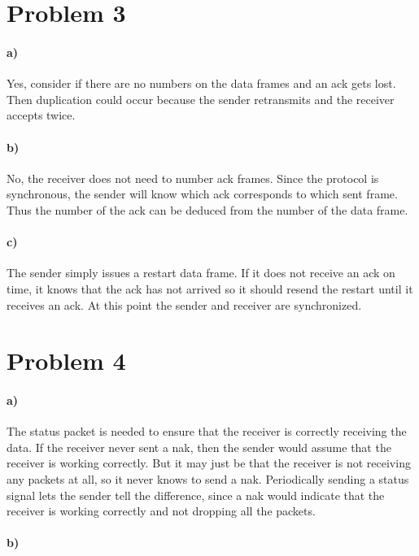 \documentclass[12pt]{article}
\begin{document}
\section*{Problem 3}

\paragraph{a)}

Yes, consider if there are no numbers on the data frames and an ack gets lost. Then duplication could occur because the sender retransmits and the receiver accepts twice.

\paragraph{b)}

No, the receiver does not need to number ack frames. Since the protocol is synchronous, the sender will know which ack corresponds to which sent frame. Thus the number of the ack
can be deduced from the number of the data frame.

\paragraph{c)}

The sender simply issues a restart data frame. If it does not receive an ack on time, it knows that the ack has not arrived so it should resend the restart until it receives an ack.
At this point the sender and receiver are synchronized.

\section*{Problem 4}

\paragraph{a)}

The status packet is needed to ensure that the receiver is correctly receiving the data. If the receiver never sent a nak, then the sender would assume that the receiver is working correctly.
But it may just be that the receiver is not receiving any packets at all, so it never knows to send a nak. Periodically sending a status signal lets the sender tell the difference, since a nak
would indicate that the receiver is working correctly and not dropping all the packets.

\paragraph{b)}
\end{document}
